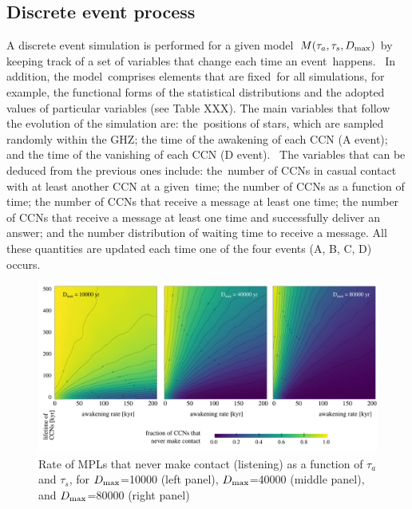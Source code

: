 \documentclass[crop]{CSLB}
\newcommand{\ceti}{CCN}
\newcommand{\cetis}{CCNs}
\begin{document}
     



\subsection{Discrete event process}

A discrete event simulation is performed for a given model $M(\tau_a,
\tau_s, D_{\rm max})$ by keeping track of a set of variables that change each time an event happens. 
%
In addition, the model comprises elements that are fixed for all simulations, for example, the functional forms of the statistical distributions and the adopted values of particular variables (see Table XXX).
%
The main variables that follow the evolution of the simulation are: the positions of stars, which are sampled randomly within the GHZ; the time of the awakening of each \ceti{} (A event); and the time of the vanishing of each \ceti{} (D event). 
%
The variables that can be deduced from the previous ones include: the number of \cetis{} in casual contact with at least another \ceti{} at a given time; the number of \cetis{} as a function of time; the number of \cetis{} that receive a message at least one time; the number of \cetis{} that receive a message at least one time and successfully deliver an answer; and the number distribution of waiting time to receive a message.
%
All these quantities are updated each time one of the four events (A, B, C, D) occurs.   





          

           
  
\begin{figure} %
   \centering
   \includegraphics[width=\textwidth]{F_never_contact.pdf}
   \caption{
Rate of MPLs that never make contact (listening) as a
function of $\tau_a$ and $\tau_s$, for 
$D_{\rm max}$=10000 (left panel),
$D_{\rm max}$=40000 (middle panel), and
$D_{\rm max}$=80000 (right panel)
%
   }
   \label{F_never_contact}
\end{figure}
 
\end{document}
